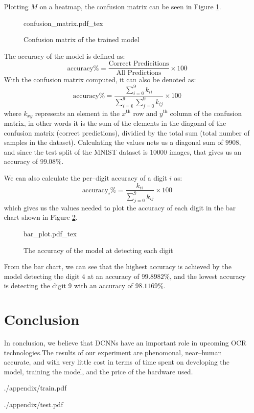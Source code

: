 \documentclass[conference]{IEEEtran}
\begin{document}
Plotting $M$ on a heatmap, the confusion matrix can be seen in Figure \ref{fig:confusion_matrix}.
\begin{figure}[!htp]
    \centering
    \def\svgwidth{\columnwidth}
    \scriptsize
    {confusion_matrix.pdf_tex}
    \caption{Confusion matrix of the trained model}\label{fig:confusion_matrix}
\end{figure}
\par The accuracy of the model is defined as:
\begin{equation}
    \text{accuracy\%}=\frac{\text{Correct Predicitions}}{\text{All Predictions}} \times 100
\end{equation}
With the confusion matrix computed, it can also be denoted as:
\begin{equation}
    \text{accuracy\%} = \frac{\sum_{i = 0}^9 k_{ii}}{\sum_{i = 0}^9 \sum_{j = 0}^9 k_{ij}} \times 100
\end{equation}
where $k_{xy}$ represents an element in the $x^\text{th}$ row and $y^\text{th}$ column of the confusion matrix, in other words it is the sum of the elements in the diagonal of the confusion matrix (correct predictions), dividied by the total sum (total number of samples in the dataset). Calculating the values nets us a diagonal sum of $9908$, and since the test split of the MNIST dataset is $10000$ images, that gives us an accuracy of $99.08\%$.
\par
We can also calculate the per--digit accuracy of a digit $i$ as:
\begin{equation}
    \text{accuracy}_{i}\% = \frac{k_{ii}}{\sum_{j = 0}^9 k_{ij}} \times 100
\end{equation}
which gives us the values needed to plot the accuracy of each digit in the bar chart shown in Figure \ref{fig:bar}.
\begin{figure}[!htp]
    \centering
    \def\svgwidth{\columnwidth}
    {bar_plot.pdf_tex}
    \caption{The accuracy of the model at detecting each digit}\label{fig:bar}
\end{figure}
\par From the bar chart, we can see that the highest accuracy is achieved by the model detecting the digit $4$ at an accuracy of $99.8982\%$, and the lowest accuracy is detecting the digit $9$ with an accuracy of $98.1169\%$.
\section{Conclusion}
In conclusion, we believe that DCNNs have an important role in upcoming OCR technologies.\@ The results of our experiment are phenomonal, near--human accurate, and with very little cost in terms of time spent on developing the model, training the model, and the price of the hardware used.\@




\onecolumn


    {./appendix/train.pdf}

    {./appendix/test.pdf}
\end{document}
